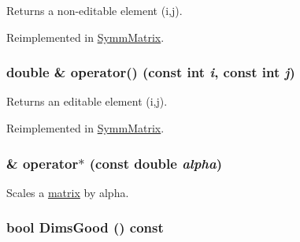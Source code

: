 Returns a non-\/editable element (i,j). 

Reimplemented in \hyperlink{classJKBuilder_1_1SymmMatrix_a9ccbac42f4eefb704f04886001f4fb3e}{SymmMatrix}.\hypertarget{classJKBuilder_1_1matrix_a3d7fca183ff1c9f4c160218746f2ef31}{
\subsubsection[{operator()}]{\setlength{\rightskip}{0pt plus 5cm}double \& operator() (const int {\em i}, \/  const int {\em j})}}
\label{classJKBuilder_1_1matrix_a3d7fca183ff1c9f4c160218746f2ef31}


Returns an editable element (i,j). 

Reimplemented in \hyperlink{classJKBuilder_1_1SymmMatrix_a3d7fca183ff1c9f4c160218746f2ef31}{SymmMatrix}.\hypertarget{classJKBuilder_1_1matrix_ad4799cbe4a5d07c77f41857a3ce914a2}{
\subsubsection[{operator$\ast$}]{ \& operator$\ast$ (const double {\em alpha})}}
\label{classJKBuilder_1_1matrix_ad4799cbe4a5d07c77f41857a3ce914a2}


Scales a \hyperlink{classJKBuilder_1_1matrix}{matrix} by alpha. \hypertarget{classJKBuilder_1_1tensor_a6e72344440b411f433eb50171648c2d0}{
\subsubsection[{DimsGood}]{\setlength{\rightskip}{0pt plus 5cm}bool DimsGood () const}}
\label{classJKBuilder_1_1tensor_a6e72344440b411f433eb50171648c2d0}



